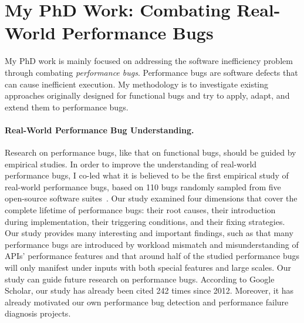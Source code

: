 \documentclass[10pt]{article}
\begin{document}
\vspace{-.1in}
\section{My PhD Work: Combating Real-World Performance Bugs}

My PhD work is mainly focused on addressing the software 
inefficiency problem through combating {\it performance bugs}. 
Performance bugs are software defects that can cause inefficient execution. 
My methodology is to investigate existing approaches originally designed for functional bugs
and try to apply, adapt, and extend them to performance bugs. 

\vspace{-.1in}
\paragraph{Real-World Performance Bug Understanding.}
Research on performance bugs, like that on functional bugs, 
should be guided by empirical studies. 
In order to improve the understanding of real-world performance bugs, 
I co-led what it is believed to be the first 
empirical study of real-world performance bugs, 
based on 110 bugs randomly sampled from five open-source software suites~\cite{jin12perfbug}. 
Our study examined four dimensions 
that cover the complete lifetime of performance bugs:
their root causes, 
their introduction during implementation, 
their triggering conditions, and their fixing strategies. 
Our study provides many interesting and important findings, 
such as that many performance bugs are introduced by workload mismatch 
and misunderstanding of APIs' performance features
and that around half of the studied performance bugs 
will only manifest under inputs with both special features and large scales. 
Our study can guide future research on performance bugs.
According to Google Scholar, our study has already been cited 
242 times since 2012. 
Moreover, it has already motivated our own performance bug detection 
and performance failure diagnosis projects.

\vspace{-.1in}
\end{document}
